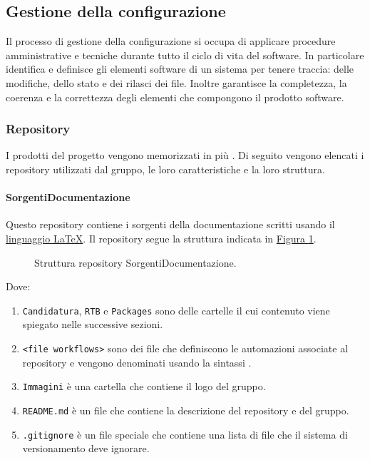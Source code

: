 \subsection{Gestione della configurazione}
\label{subsec:gestione_della_configurazione}
Il processo di gestione della configurazione si occupa di applicare procedure amministrative e tecniche durante tutto il ciclo di vita del software. 
In particolare identifica e definisce gli elementi software di un sistema per tenere traccia: delle modifiche, dello stato e dei rilasci dei file.
Inoltre garantisce la completezza, la coerenza e la correttezza degli elementi che compongono il prodotto software.

\subsubsection{Repository}
\label{subsubsec:repository}
I prodotti del progetto vengono memorizzati in più .
Di seguito vengono elencati i repository utilizzati dal gruppo, le loro caratteristiche e la loro struttura.

\paragraph{SorgentiDocumentazione}
Questo repository contiene i sorgenti della documentazione scritti usando il \hyperref[par:latex]{linguaggio LaTeX}.
Il repository segue la struttura indicata in \hyperref[fig:repo_sorgenti_documenti]{Figura \ref{fig:repo_sorgenti_documenti}}.
\begin{figure}[!h]
    \caption{Struttura repository SorgentiDocumentazione.}
    \label{fig:repo_sorgenti_documenti}
\end{figure}
Dove:
\begin{enumerate}
    \item \texttt{Candidatura}, \texttt{RTB} e \texttt{Packages} sono delle cartelle il cui contenuto viene spiegato nelle successive sezioni.
    \item \texttt{<file workflows>} sono dei file che definiscono le automazioni associate al repository e vengono denominati usando la sintassi .
    \item \texttt{Immagini} è una cartella che contiene il logo del gruppo.
    \item \texttt{README.md} è un file che contiene la descrizione del repository e del gruppo.
    \item \texttt{.gitignore} è un file speciale che contiene una lista di file che il sistema di versionamento deve ignorare.
\end{enumerate}

